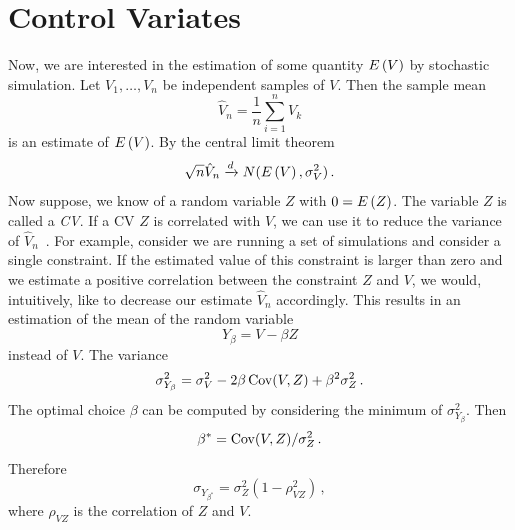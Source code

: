 \section{Control Variates}\label{sec:cv:var_red}
Now, we are interested in the estimation of some quantity ${E}\left(V\right)$
by stochastic simulation.
Let $V_1,\dots,V_n$ be independent samples of $V$.
Then the sample mean 
\[
	\hat{V}_n =\frac{1}{n}\sum_{i=1}^n V_k
\]
is an estimate of ${E}\left(V\right)$.  By the central limit theorem
\[
\sqrt{n}\hat{V}_n\xrightarrow{d}N({E}\left(V\right),\sigma_V^2)\,.
\]
Now suppose, we know of a random variable $Z$ with $0={E}\left(Z\right)$.
The variable $Z$ is called a \emph{\acf{CV}}.
If a \acl{CV} $Z$ is correlated with $V$, we can
use it to
reduce the variance of $\hat{V}_n$~\parencite{glasserman2005large,nelson1990control,szechtman2003control,wilson1984variance}.
For example, consider we are running a set of simulations and consider a single
constraint.
If the estimated value of this constraint is larger than zero and we estimate a positive correlation
between the constraint $Z$ and $V$, we would, intuitively, like to {decrease} our
estimate $\hat{V}_n$ accordingly.
This results in an estimation of the mean of the random variable
\[
	Y_{\beta}= V-\beta Z
\]
instead of $V$.
The variance%
\[
	\sigma_{Y_{\beta}}^2 = \sigma_V^2-2\beta \operatorname*{Cov}(V, Z) + \beta^2\sigma_Z^2\,.
\]
The optimal choice $\beta$ can be computed by  considering the minimum of $\sigma_{Y_\beta}^2$. Then
\[
	\beta^{*}={\operatorname*{Cov}(V, Z)}/{\sigma_Z^2}\,.
\]
Therefore 
\[
	\sigma_{Y_{\beta^{*}}}=\sigma_Z^2(1 - \rho_{VZ}^2)\,,
\]
where $\rho_{VZ}$ is the correlation of $Z$ and $V$.

